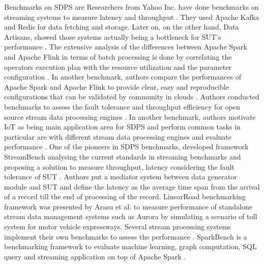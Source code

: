  Benchmarks on SDPS are  Researchers from Yahoo Inc. have done benchmarks on streaming systems to measure latency and throughput \cite{chintapalli2016benchmarking}. They used Apache Kafka \cite{kafka2014high} and Redis \cite{carlson2013redis} for data fetching and storage. Later on, on the other hand, Data Artisans, showed those systems actually being a bottleneck for SUT's performance \cite{dataartisans}.  The extensive analysis of the differences between Apache Spark and Apache Flink in terms of batch processing is done by correlating the operators execution plan with the resource utilization and the parameter configuration \cite{marcu2016spark}. In another benchmark, authors compare the performances of Apache Spark and Apache Flink to  provide clear, easy and reproducible configurations that can be validated by community in clouds \cite{perera2016reproducible}. Authors conducted  benchmarks to assess the fault tolerance and throughput efficiency for open source stream data processing engines \cite{lopez2016performance}. In another benchmark, authors motivate IoT as being main application area for SDPS and perform common tasks in particular are with different stream data processing engines and evaluate performance \cite{shukla2016benchmarking}. One of the pioneers in SDPS benchmarks, developed framework StreamBench analysing the current standards in streaming benchmarks and proposing a solution to measure throughput, latency considering the fault tolerance of SUT \cite{lu2014stream}. Authors put a mediator system between data generator module and SUT and define the latency as the average time span from the arrival of a record till the end of processing of the record. LinearRoad benchmarking framework was presented by Arasu et al. to measure performance of standalone stream data management systems such as Aurora \cite{abadi2003aurora} by simulating a scenario of toll system for motor vehicle expressways. Several stream processing systems implement their own benchmarks to assess the performance \cite{neumeyer2010s4,qian2013timestream,zaharia2012discretized}. SparkBench is a benchmarking framework to evaluate machine learning, graph computation, SQL query and streaming application on top of Apache Spark \cite{li2015sparkbench}.
